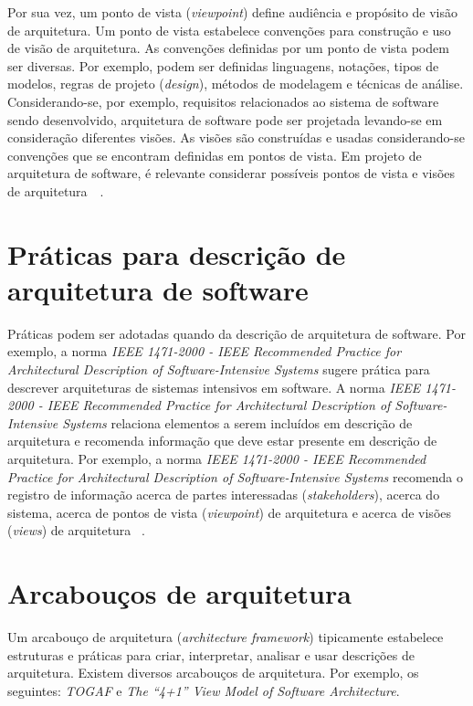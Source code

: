 Por sua vez, um ponto de vista (\emph{viewpoint}) define audiência e propósito de visão de arquitetura. Um ponto de vista estabelece convenções para construção e uso de visão de arquitetura. As convenções definidas por um ponto de vista podem ser diversas. Por exemplo, podem ser definidas linguagens, notações, tipos de modelos, regras de projeto (\emph{design}), métodos de modelagem e técnicas de análise. Considerando-se, por exemplo, requisitos relacionados ao sistema de software sendo desenvolvido, arquitetura de software pode ser projetada levando-se em consideração diferentes visões. As visões são construídas e usadas considerando-se convenções que se encontram definidas em pontos de vista. Em projeto de arquitetura de software, é relevante considerar possíveis pontos de vista e visões de arquitetura~\cite{ISO_1471}~\cite{ISO_42010}. 



\section{Práticas para descrição de arquitetura de software}


Práticas podem ser adotadas quando da descrição de arquitetura de software. Por exemplo, a norma  \emph{IEEE 1471-2000 - IEEE Recommended Practice for Architectural Description of Software-Intensive Systems} sugere prática para descrever arquiteturas de sistemas intensivos em software. A norma \emph{IEEE 1471-2000 - IEEE Recommended Practice for Architectural Description of Software-Intensive Systems} relaciona elementos a serem incluídos em descrição de arquitetura e recomenda informação que deve estar presente em descrição de arquitetura. Por exemplo, a norma \emph{IEEE 1471-2000 - IEEE Recommended Practice for Architectural Description of Software-Intensive Systems} recomenda o registro de informação acerca de partes interessadas (\emph{stakeholders}), acerca do sistema, acerca de pontos de vista (\emph{viewpoint}) de arquitetura e acerca de visões (\emph{views}) de arquitetura ~\cite{ISO_1471}.

\section{Arcabouços de arquitetura}

Um arcabouço de arquitetura (\emph{architecture framework}) tipicamente estabelece estruturas e práticas para criar, interpretar, analisar e usar descrições de arquitetura. Existem diversos arcabouços de arquitetura. Por exemplo, os seguintes: \emph{\acrfull{TOGAF}} e \emph{The “4+1” View Model of Software Architecture}. 

